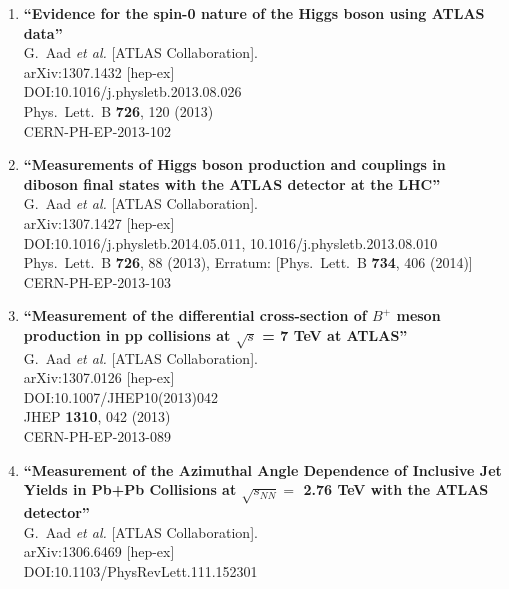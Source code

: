 \documentclass{article}
\begin{document}
\begin{enumerate}
\item%
{\bf ``Evidence for the spin-0 nature of the Higgs boson using ATLAS data''}
  \\{}G.~Aad {\it et al.} [ATLAS Collaboration].
  \\{}arXiv:1307.1432 [hep-ex]
  \\{}DOI:10.1016/j.physletb.2013.08.026
  \\{}Phys.\ Lett.\ B {\bf 726}, 120 (2013)
  \\{}CERN-PH-EP-2013-102
\item%
{\bf ``Measurements of Higgs boson production and couplings in diboson final states with the ATLAS detector at the LHC''}
  \\{}G.~Aad {\it et al.} [ATLAS Collaboration].
  \\{}arXiv:1307.1427 [hep-ex]
  \\{}DOI:10.1016/j.physletb.2014.05.011, 10.1016/j.physletb.2013.08.010
  \\{}Phys.\ Lett.\ B {\bf 726}, 88 (2013), Erratum: [Phys.\ Lett.\ B {\bf 734}, 406 (2014)]
  \\{}CERN-PH-EP-2013-103
\item%
{\bf ``Measurement of the differential cross-section of $B^{+}$ meson production in pp collisions at $\sqrt{s}$ = 7 TeV at ATLAS''}
  \\{}G.~Aad {\it et al.} [ATLAS Collaboration].
  \\{}arXiv:1307.0126 [hep-ex]
  \\{}DOI:10.1007/JHEP10(2013)042
  \\{}JHEP {\bf 1310}, 042 (2013)
  \\{}CERN-PH-EP-2013-089
\item%
{\bf ``Measurement of the Azimuthal Angle Dependence of Inclusive Jet Yields in Pb+Pb Collisions at $\sqrt{s_{NN}}=$ 2.76 TeV with the ATLAS detector''}
  \\{}G.~Aad {\it et al.} [ATLAS Collaboration].
  \\{}arXiv:1306.6469 [hep-ex]
  \\{}DOI:10.1103/PhysRevLett.111.152301

\end{enumerate}
\end{document}
